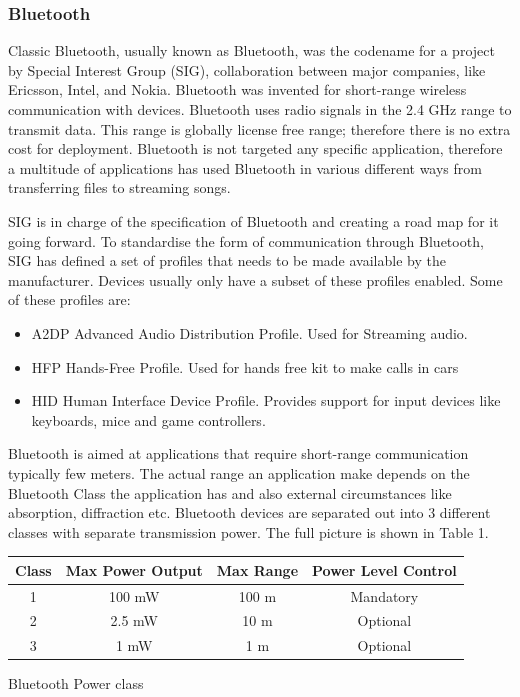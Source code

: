 \subsubsection{Bluetooth}

Classic Bluetooth, usually known as Bluetooth, was the codename for
a project by Special Interest Group (SIG), collaboration between major
companies, like Ericsson, Intel, and Nokia. Bluetooth was invented
for short-range wireless communication with devices. Bluetooth uses
radio signals in the 2.4 GHz range to transmit data. This range is
globally license free range; therefore there is no extra cost for
deployment. Bluetooth is not targeted any specific application, therefore
a multitude of applications has used Bluetooth in various different
ways from transferring files to streaming songs.

SIG is in charge of the specification of Bluetooth and creating a
road map for it going forward. To standardise the form of communication
through Bluetooth, SIG has defined a set of profiles that needs to
be made available by the manufacturer. Devices usually only have a
subset of these profiles enabled. Some of these profiles are: 
\begin{itemize}
\item A2DP Advanced Audio Distribution Profile. Used for Streaming audio. 
\item HFP Hands-Free Profile. Used for hands free kit to make calls in cars 
\item HID Human Interface Device Profile. Provides support for input devices
like keyboards, mice and game controllers.
\end{itemize}
Bluetooth is aimed at applications that require short-range communication
typically few meters. The actual range an application make depends
on the Bluetooth Class the application has and also external circumstances
like absorption, diffraction etc. Bluetooth devices are separated
out into 3 different classes with separate transmission power. The
full picture is shown in Table 1.

\begin{tabular}{|c|c|c|c|}
\hline 
Class & Max Power Output & Max Range & Power Level Control\tabularnewline
\hline 
\hline 
1 & 100 mW & 100 m  & Mandatory\tabularnewline
\hline 
2 & 2.5 mW & 10 m & Optional\tabularnewline
\hline 
3 & 1 mW & 1 m & Optional\tabularnewline
\hline 
\end{tabular}
\begin{table}[H]
\protect\caption{Bluetooth Power class}
\end{table}


